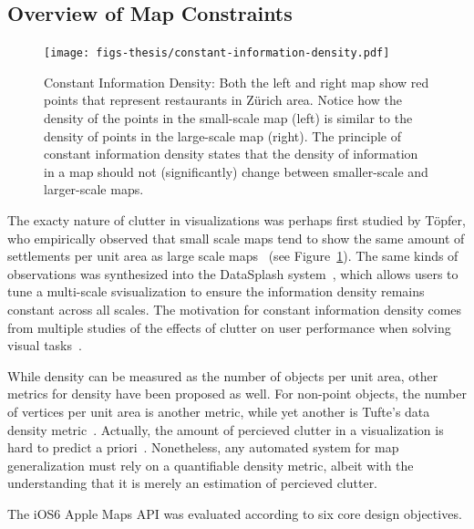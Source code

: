 \documentclass[11pt, oneside]{report}
\begin{document}
\subsection{Overview of Map Constraints}

\begin{figure}[htbp]
\begin{center}
\texttt{[image: figs-thesis/constant-information-density.pdf]}
\caption{Constant Information Density: Both the left and right map show red points that represent restaurants in Z{\"u}rich area. Notice how the density of the points in the small-scale map (left) is similar to the density of points in the large-scale map (right). The principle of constant information density states that the density of information in a map should not (significantly) change between smaller-scale and larger-scale maps.}
\label{fig:state:of:the:art:constant:information:density}
\end{center}
\vspace*{-4ex}
\end{figure}

The exacty nature of clutter in visualizations was perhaps first studied by T{\"o}pfer, who empirically observed that small scale maps tend to show the same amount of settlements per unit area as large scale maps~\cite{topfer1966principles} (see Figure~\ref{fig:state:of:the:art:constant:information:density}). The same kinds of observations was synthesized into the DataSplash system~\cite{woodruff1998constant}, which allows users to tune a multi-scale svisualization to ensure the information density remains constant across all scales. The motivation for constant information density comes from multiple studies of the effects of clutter on user performance when solving visual tasks~\cite{phillips1982investigation, springer1987retrieval, tullis1988screen}. 

While density can be measured as the number of objects per unit area, other metrics for density have been proposed as well. For non-point objects, the number of vertices per unit area is another metric, while yet another is Tufte's data density metric~\cite{tufte1983visual}. Actually, the amount of percieved clutter in a visualization is hard to predict a priori~\cite{phillips1982investigation}. Nonetheless, any automated system for map generalization must rely on a quantifiable density metric, albeit with the understanding that it is merely an estimation of percieved clutter.

The iOS6 Apple Maps API was evaluated 	according to six core design objectives.
\end{document}
